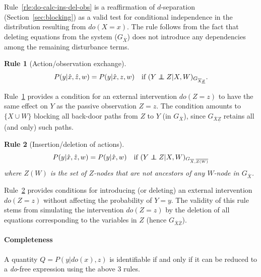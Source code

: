 \documentclass[11pt]{article}
\numberwithin{equation}{section}
\newcommand\indep{\protect\mathpalette{\protect\independenT}{\perp}}
\def\independenT#1#2{\mathrel{\rlap{$#1#2$}\mkern2mu{#1#2}}}
\newtheorem{rle}{Rule}[section]
\begin{document}
Rule~\ref{rle:do-calc-ins-del-obs} is a reaffirmation of $d$-separation (Section~\ref{sec:blocking}) as a valid test for conditional independence in the distribution resulting from $do(X=x)$. The rule follows from the fact that deleting equations from the system ($G_{{\overline{X}}}$) does not introduce any dependencies among the remaining disturbance terms.

\begin{rle}[Action/observation exchange]
\begin{equation}
P(y|\hat{x},\hat{z},w) = P(y|\hat{x},z,w) \quad \text{if}\ (Y \indep Z|X,W)_{G_{{\overline{X}\underline{Z}}}}.
\end{equation}  \label{rle:do-calc-act-obs-ex}
\end{rle}

Rule~\ref{rle:do-calc-act-obs-ex} provides a condition for an external intervention $do(Z=z)$ to have the same effect on $Y$ as the passive observation $Z=z$. The condition amounts to $\{X \cup W\}$ blocking all back-door paths from $Z$ to $Y$ (in $G_{\overline{X}}$), since $G_{\overline{X}\underline{Z}}$ retains all (and only) such paths.

\begin{rle}[Insertion/deletion of actions] 
\begin{equation}
P(y|\hat{x},\hat{z},w) = P(y|\hat{x},w) \quad \text{if}\ (Y \indep Z|X,W)_{G_{{\overline{X},\overline{Z(W)}}}}
\end{equation}  \label{rle:do-calc-ins-del-act}
where $Z(W)$ is the set of $Z$-nodes that are not ancestors of any $W$-node in $G_{\overline{X}}$.
\end{rle}

Rule~\ref{rle:do-calc-ins-del-act} provides conditions for introducing (or deleting) an external intervention $do(Z=z)$ without affecting the probability of $Y=y$. The validity of this rule stems from simulating the intervention $do(Z=z)$ by the deletion of all equations corresponding to the variables in $Z$ (hence $G_{\overline{X} \overline{Z}}$).

\paragraph{Completeness} A quantity $Q=P(y|do(x),z)$ is identifiable if and only if it can be reduced to a \textit{do}-free expression using the above 3 rules.
\end{document}
